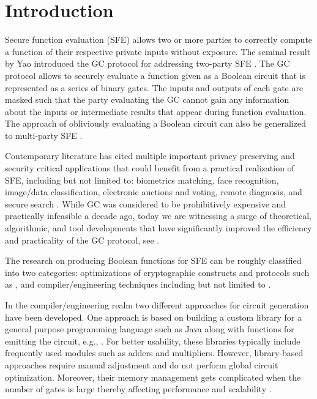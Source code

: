 \chapter{Introduction}\label{ch:intro}
Secure function evaluation (SFE) allows two or more parties to correctly compute a function of their respective private inputs without exposure.
The seminal result by Yao introduced the GC protocol for addressing two-party SFE \cite{yao1986generate}.
The GC protocol allows to securely evaluate a function given as a Boolean circuit that is represented as a series of binary gates.
The inputs and outputs of each gate are masked such that the party evaluating the GC cannot gain any information about the inputs or  intermediate results that appear during function evaluation.
The approach of obliviously evaluating a Boolean circuit can also be generalized to multi-party SFE \cite{goldreich1987play,Ben-DavidNP08}.

Contemporary literature has cited multiple important privacy preserving and security critical applications that could benefit from a practical realization of SFE, including but not limited to: biometrics matching, face recognition, image/data classification, electronic auctions and voting, remote diagnosis, and secure search \cite{bringer2013privacy, evans2011efficient, barni2009secure, naor1999privacy, brickell2007privacy, JKS08}.
While GC was considered to be prohibitively expensive and practically infeasible a decade ago, today we are witnessing a surge of theoretical, algorithmic, and tool developments that have significantly improved the efficiency and practicality of the GC protocol, see \cite{malkhi2004fairplay, kolesnikov2008improved, pinkas2009secure, huang2011faster, bellare2013efficient}.

The research on producing Boolean functions for SFE can be roughly classified into two categories: optimizations of cryptographic constructs and protocols such as  \cite{kolesnikov2008improved,pinkas2009secure,bellare2012foundations,bellare2013efficient,kolesnikov2014flexor,zahur2014two}, and compiler/engineering techniques including but not limited to \cite{malkhi2004fairplay,kreuter2012billion,huang2011faster, malka2011vmcrypt,HS13,kreuter2013pcf,franz2014cbmc}.

In the compiler/engineering realm two different approaches for circuit generation have been developed.
One approach is based on building a custom library for a general purpose programming language such as Java along with functions for emitting the circuit, e.g., \cite{huang2011faster,malka2011vmcrypt,HS13}.
For better usability, these libraries typically include frequently used modules such as adders and multipliers.
However, library-based approaches require manual adjustment and do not perform global circuit optimization.
Moreover, their memory management gets complicated when the number of gates is large thereby affecting performance and scalability \cite{HS13}.

